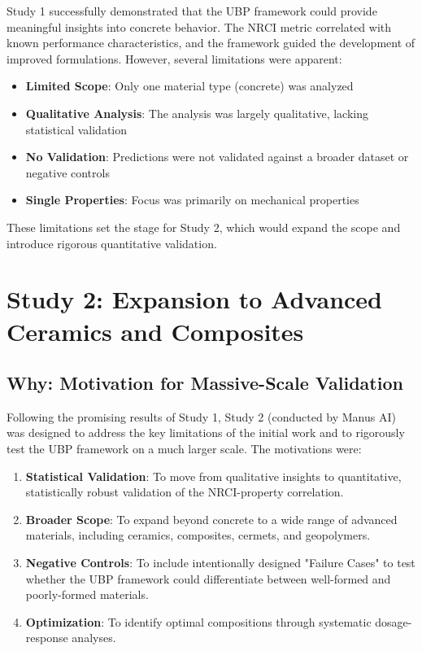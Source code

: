 \documentclass[11pt,a4paper]{article}
\begin{document}
Study 1 successfully demonstrated that the UBP framework could provide meaningful insights into concrete behavior. The NRCI metric correlated with known performance characteristics, and the framework guided the development of improved formulations. However, several limitations were apparent:

\begin{itemize}
    \item \textbf{Limited Scope}: Only one material type (concrete) was analyzed
    \item \textbf{Qualitative Analysis}: The analysis was largely qualitative, lacking statistical validation
    \item \textbf{No Validation}: Predictions were not validated against a broader dataset or negative controls
    \item \textbf{Single Properties}: Focus was primarily on mechanical properties
\end{itemize}

These limitations set the stage for Study 2, which would expand the scope and introduce rigorous quantitative validation.

\section{Study 2: Expansion to Advanced Ceramics and Composites}

\subsection{Why: Motivation for Massive-Scale Validation}

Following the promising results of Study 1, Study 2 (conducted by Manus AI) was designed to address the key limitations of the initial work and to rigorously test the UBP framework on a much larger scale. The motivations were:

\begin{enumerate}
    \item \textbf{Statistical Validation}: To move from qualitative insights to quantitative, statistically robust validation of the NRCI-property correlation.
    
    \item \textbf{Broader Scope}: To expand beyond concrete to a wide range of advanced materials, including ceramics, composites, cermets, and geopolymers.
    
    \item \textbf{Negative Controls}: To include intentionally designed "Failure Cases" to test whether the UBP framework could differentiate between well-formed and poorly-formed materials.
    
    \item \textbf{Optimization}: To identify optimal compositions through systematic dosage-response analyses.
\end{enumerate}
\end{document}
